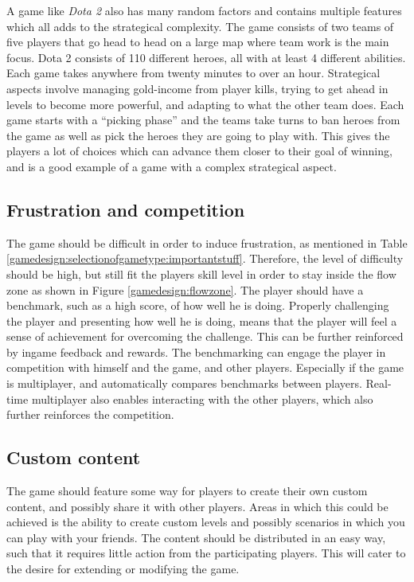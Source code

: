 A game like \textit{Dota 2}\cite{Dota2} also has many random factors and contains multiple features which all adds to the strategical complexity.
The game consists of two teams of five players that go head to head on a large map where team work is the main focus.
Dota 2 consists of 110 different heroes, all with at least 4 different abilities.
Each game takes anywhere from twenty minutes to over an hour.
Strategical aspects involve managing gold-income from player kills, trying to get ahead in levels to become more powerful, and adapting to what the other team does.
Each game starts with a ``picking phase'' and the teams take turns to ban heroes from the game as well as pick the heroes they are going to play with.
This gives the players a lot of choices which can advance them closer to their goal of winning, and is a good example of a game with a complex strategical aspect.

\subsection{Frustration and competition}\label{selectionofgametype:frustration}
The game should be difficult in order to induce frustration, as mentioned in Table  \ref{gamedesign:selectionofgametype:importantstuff}.
Therefore, the level of difficulty should be high, but still fit the players skill level in order to stay inside the flow zone as shown in Figure \ref{gamedesign:flowzone}.
The player should have a benchmark, such as a high score, of how well he is doing.
Properly challenging the player and presenting how well he is doing, means that the player will feel a sense of achievement for overcoming the challenge.
This can be further reinforced by ingame feedback and rewards.
The benchmarking can engage the player in competition with himself and the game, and other players.
Especially if the game is multiplayer, and automatically compares benchmarks between players.
Real-time multiplayer also enables interacting with the other players, which also further reinforces the competition.

\subsection{Custom content}\label{sec:selectionofgametype:customcontent}
The game should feature some way for players to create their own custom content, and possibly share it with other players. Areas in which this could be achieved is the ability to create custom levels and possibly scenarios in which you can play with your friends. The content should be distributed in an easy way, such that it requires little action from the participating players.
This will cater to the desire for extending or modifying the game.


